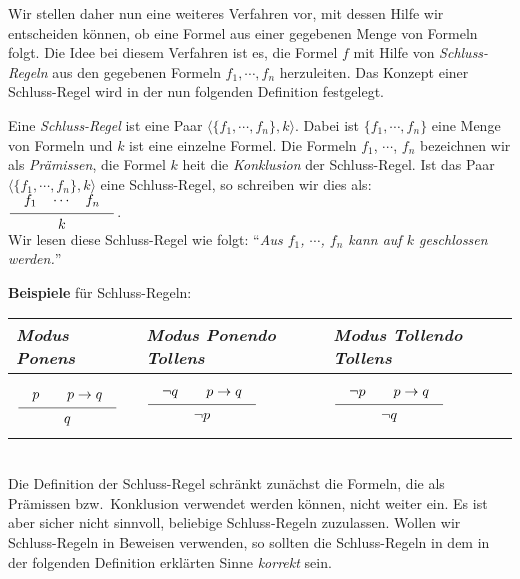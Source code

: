 Wir stellen daher nun eine weiteres Verfahren vor, mit dessen Hilfe wir entscheiden
k\"{o}nnen, ob eine Formel aus einer gegebenen Menge von Formeln folgt.  Die Idee bei diesem Verfahren
ist es, die Formel $f$ mit Hilfe von \emph{Schluss-Regeln} aus den gegebenen Formeln 
$f_1, \cdots, f_n$ herzuleiten.
  Das Konzept einer Schluss-Regel wird in der nun folgenden Definition festgelegt.
\begin{Definition}
    Eine \emph{Schluss-Regel} ist eine Paar  $\langle \{f_1, \cdots, f_n\}, k \rangle$.
    Dabei ist 
    $\{f_1, \cdots, f_n\}$ eine Menge von Formeln und $k$ ist eine einzelne Formel.  
    Die Formeln $f_1$, $\cdots$, $f_n$ bezeichnen wir als
    \emph{Pr\"{a}missen}, die Formel $k$ hei\3t die \emph{Konklusion} der Schluss-Regel.
    Ist das Paar 
    $\langle \{f_1, \cdots, f_n\}, k \rangle$ eine Schluss-Regel, so schreiben wir
    dies als: 
    \\[0.3cm]
    \hspace*{1.3cm}      
    $\schluss{f_1 \quad \cdots \quad f_n}{k}$.
    \\[0.3cm]
    Wir lesen diese Schluss-Regel wie folgt: 
    ``\textsl{Aus $f_1$, $\cdots$, $f_n$ kann auf $k$ geschlossen werden.}''
    \eox
\end{Definition}
\vspace*{0.3cm}

\noindent
\textbf{Beispiele} f\"{u}r Schluss-Regeln: 
\\[0.2cm]
\hspace*{1.3cm}            
\begin{tabular}[t]{|l|l|l|}
\hline
\rule{0pt}{15pt} \emph{Modus Ponens} & \emph{Modus Ponendo Tollens} & \emph{Modus Tollendo Tollens} \\[0.3cm]
\hline
$
\rule[-15pt]{0pt}{40pt}\schluss{p \quad\quad p \rightarrow q}{q}$ &
$\schluss{\neg q \quad\quad p \rightarrow q}{\neg p}$ &
$\schluss{\neg p \quad\quad p \rightarrow q}{\neg q}$ \\[0.3cm]
\hline
\end{tabular}
\\[0.3cm]

\noindent
Die Definition der Schluss-Regel schr\"{a}nkt zun\"{a}chst die Formeln, die als Pr\"{a}missen
bzw.~Konklusion verwendet werden k\"{o}nnen, nicht weiter ein.  Es ist aber sicher nicht
sinnvoll, beliebige Schluss-Regeln zuzulassen.  Wollen wir Schluss-Regeln in Beweisen
verwenden, so sollten die Schluss-Regeln in dem in der folgenden Definition erkl\"{a}rten
Sinne \emph{korrekt} sein.
\pagebreak

